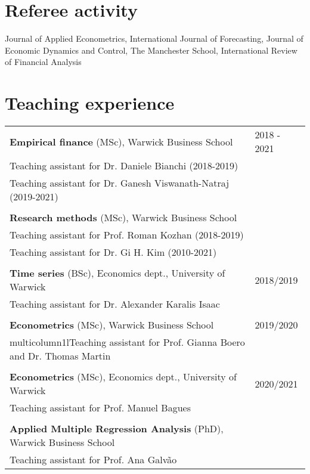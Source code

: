 \documentclass[a4paper,12pt]{article}
\begin{document}
\section{Referee activity}
Journal of Applied Econometrics, International Journal of Forecasting, Journal of Economic Dynamics and Control, The Manchester School, International Review of Financial Analysis

\section{Teaching experience}
\begin{tabular*}{\linewidth}{@{}l@{\hspace{.05\linewidth}}l}
\textbf{Empirical finance} (MSc), Warwick Business School & 2018 - 2021\\
Teaching assistant for Dr. Daniele Bianchi (2018-2019)\\
Teaching assistant for Dr. Ganesh Viswanath-Natraj (2019-2021) \\
\\[.25em]
\textbf{Research methods} (MSc), Warwick Business School \\
Teaching assistant for Prof. Roman Kozhan (2018-2019)\\
Teaching assistant for Dr. Gi H. Kim (2010-2021)\\
\\[.25em]
\textbf{Time series} (BSc), Economics dept., University of Warwick & 2018/2019 \\
\multicolumn{1}{l}{Teaching assistant for Dr. Alexander Karalis Isaac} \\
\\[.25em]
\textbf{Econometrics} (MSc), Warwick Business School & 2019/2020\\
multicolumn{1}{l}{Teaching assistant for Prof. Gianna Boero and Dr. Thomas Martin }\\
\\[.25em]
\textbf{Econometrics} (MSc), Economics dept.,  University of Warwick & 2020/2021\\
\multicolumn{1}{l}{Teaching assistant for Prof. Manuel Bagues}\\
\\[.25em]
\textbf{Applied Multiple Regression Analysis} (PhD), Warwick Business School \\
\multicolumn{1}{l}{Teaching assistant for Prof. Ana Galv\~ao}\\
\end{tabular*}
\end{document}
